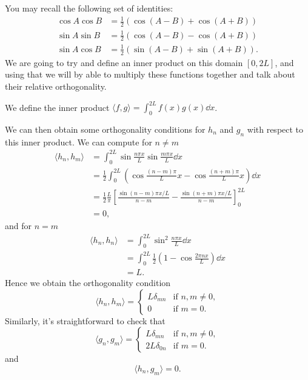 \documentclass[a4paper]{scrartcl}
\begin{document}
You may recall the following set of identities:
\begin{align*}
    \cos A \cos B &= \frac{1}{2}\left(\cos(A - B) + \cos(A + B)\right) \\
    \sin A \sin B &= \frac{1}{2}\left(\cos(A - B) - \cos(A + B)\right) \\
    \sin A \cos B &= \frac{1}{2}\left(\sin(A - B) + \sin(A + B)\right).
\end{align*}
We are going to try and define an inner product on this domain $[0, 2L]$, and using that we will by able to multiply these functions together and talk about their relative orthogonality.

\begin{definition}
    We define the inner product
    $\langle f, g \rangle = \int_0^{2L} f(x) g(x) \dd x$.
\end{definition}

We can then obtain some orthogonality conditions for $h_n$ and $g_n$ with respect to this inner product. We can compute for $n \neq m$
\begin{align*}
    \langle h_n, h_m \rangle &= \int_0^{2L} \sin \frac{n \pi x}{L} \sin \frac{m \pi x}{L} \dd x \\
    &= \frac{1}{2}\int_0^{2L} \left(\cos \frac{(n -m) \pi }{L}x - \cos \frac{(n + m )\pi}{L} x\right) \dd x \\
    &= \frac{1}{2} \frac{L}{\pi}\left[\frac{\sin (n - m) \pi x /L}{n - m} - \frac{\sin (n + m) \pi x /L}{n - m}\right]_0^{2L} \\
    &= 0,
\end{align*}
and for $n = m$
\begin{align*}
    \langle h_n, h_n \rangle &= \int_0^{2L} \sin^2 \frac{n \pi x}{L} \dd x \\
                             &= \int_0^{2L} \frac{1}{2}\left(1 - \cos \frac{2 \pi n x}{L}\right) \dd x \\
                             &= L.
\end{align*}
Hence we obtain the orthogonality condition
$$
\langle h_n, h_m \rangle = \begin{cases}
    L \delta_{mn} &\mbox{if } n, m \neq 0, \\
    0 &\mbox{if } m = 0.
   \end{cases}
$$
Similarly, it's straightforward to check that
$$
\langle g_n, g_m \rangle = \begin{cases}
    L \delta_{mn} &\mbox{if } n, m \neq 0, \\
    2L \delta_{0n} &\mbox{if } m = 0.
   \end{cases}
$$
and
$$
\langle h_n, g_m \rangle = 0.
$$
\end{document}
